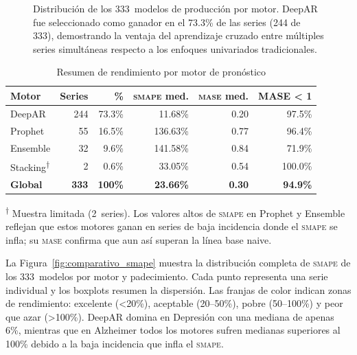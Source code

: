 \documentclass[12pt, letterpaper]{article}
\newcommand{\smape}{\textnormal{\textsc{smape}}}
\newcommand{\mase}{\textnormal{\textsc{mase}}}
\newcommand{\figref}[1]{Figura~\ref{#1}}
\begin{document}
\begin{figure}[H]
\vspace{0.2cm}
\caption[Distribución de motores en producción.]{Distribución de los 333~modelos de producción por motor. DeepAR fue seleccionado como ganador en el 73.3\% de las series (244 de 333), demostrando la ventaja del aprendizaje cruzado entre múltiples series simultáneas respecto a los enfoques univariados tradicionales.}
\label{fig:distribucion_motores}
\end{figure}

\begin{table}[H]
\centering
\caption{Resumen de rendimiento por motor de pronóstico}
\label{tab:rendimiento_motores}
\small
\begin{tabularx}{\textwidth}{X r r r r r}
\toprule
\textbf{Motor} & \textbf{Series} & \textbf{\%} & \textbf{\smape{} med.} & \textbf{\mase{} med.} & \textbf{MASE < 1} \\
\midrule
DeepAR    & 244 & 73.3\% & 11.68\% & 0.20 & 97.5\% \\
Prophet   &  55 & 16.5\% & 136.63\% & 0.77 & 96.4\% \\
Ensemble  &  32 &  9.6\% & 141.58\% & 0.84 & 71.9\% \\
Stacking\textsuperscript{$\dagger$}  &   2 &  0.6\% & 33.05\% & 0.54 & 100.0\% \\
\midrule
\textbf{Global} & \textbf{333} & \textbf{100\%} & \textbf{23.66\%} & \textbf{0.30} & \textbf{94.9\%} \\
\bottomrule
\end{tabularx}
\begin{flushleft}
\scriptsize \textsuperscript{$\dagger$} Muestra limitada (2~series). Los valores altos de \smape{} en Prophet y Ensemble reflejan que estos motores ganan en series de baja incidencia donde el \smape{} se infla; su \mase{} confirma que aun así superan la línea base naive.
\end{flushleft}
\end{table}

La \figref{fig:comparativo_smape} muestra la distribución completa de \smape{} de los 333~modelos por motor y padecimiento. Cada punto representa una serie individual y los boxplots resumen la dispersión. Las franjas de color indican zonas de rendimiento: excelente (<20\%), aceptable (20--50\%), pobre (50--100\%) y peor que azar (>100\%). DeepAR domina en Depresión con una mediana de apenas 6\%, mientras que en Alzheimer todos los motores sufren medianas superiores al 100\% debido a la baja incidencia que infla el \smape{}.
\end{document}
